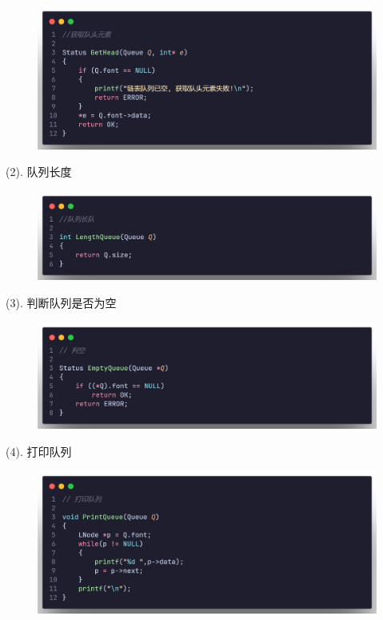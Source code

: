 \begin{figure}[H]
    \centering
    \includegraphics[scale=0.2]{"figure/Note/Stack/QlG.png"}
\end{figure}

(2). 队列长度

\begin{figure}[H]
    \centering
    \includegraphics[scale=0.2]{"figure/Note/Stack/QlLen.png"}
\end{figure}

(3). 判断队列是否为空

\begin{figure}[H]
    \centering
    \includegraphics[scale=0.2]{"figure/Note/Stack/QlEmpty.png"}
\end{figure}

(4). 打印队列

\begin{figure}[H]
    \centering
    \includegraphics[scale=0.2]{"figure/Note/Stack/QlPrint.png"}
\end{figure}

